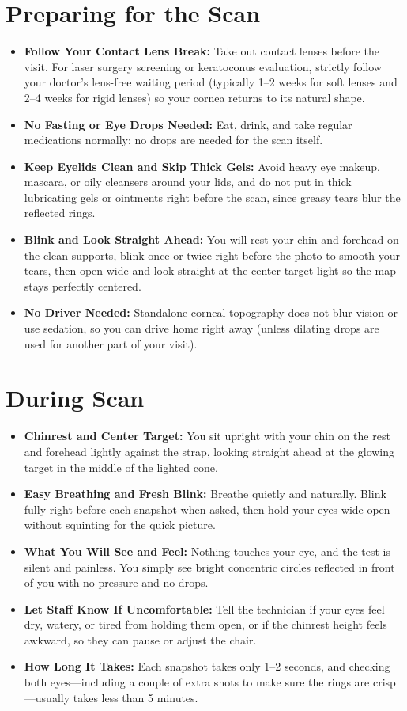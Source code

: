 \section{Preparing for the Scan}
\begin{itemize}
    \item \textbf{Follow Your Contact Lens Break:} Take out contact lenses before the visit. For laser surgery screening or keratoconus evaluation, strictly follow your doctor's lens-free waiting period (typically 1--2 weeks for soft lenses and 2--4 weeks for rigid lenses) so your cornea returns to its natural shape.
    \item \textbf{No Fasting or Eye Drops Needed:} Eat, drink, and take regular medications normally; no drops are needed for the scan itself.
    \item \textbf{Keep Eyelids Clean and Skip Thick Gels:} Avoid heavy eye makeup, mascara, or oily cleansers around your lids, and do not put in thick lubricating gels or ointments right before the scan, since greasy tears blur the reflected rings.
    \item \textbf{Blink and Look Straight Ahead:} You will rest your chin and forehead on the clean supports, blink once or twice right before the photo to smooth your tears, then open wide and look straight at the center target light so the map stays perfectly centered.
    \item \textbf{No Driver Needed:} Standalone corneal topography does not blur vision or use sedation, so you can drive home right away (unless dilating drops are used for another part of your visit).
\end{itemize}

\section{During Scan}
\begin{itemize}
    \item \textbf{Chinrest and Center Target:} You sit upright with your chin on the rest and forehead lightly against the strap, looking straight ahead at the glowing target in the middle of the lighted cone.
    \item \textbf{Easy Breathing and Fresh Blink:} Breathe quietly and naturally. Blink fully right before each snapshot when asked, then hold your eyes wide open without squinting for the quick picture.
    \item \textbf{What You Will See and Feel:} Nothing touches your eye, and the test is silent and painless. You simply see bright concentric circles reflected in front of you with no pressure and no drops.
    \item \textbf{Let Staff Know If Uncomfortable:} Tell the technician if your eyes feel dry, watery, or tired from holding them open, or if the chinrest height feels awkward, so they can pause or adjust the chair.
    \item \textbf{How Long It Takes:} Each snapshot takes only 1--2 seconds, and checking both eyes---including a couple of extra shots to make sure the rings are crisp---usually takes less than 5 minutes.
\end{itemize}


